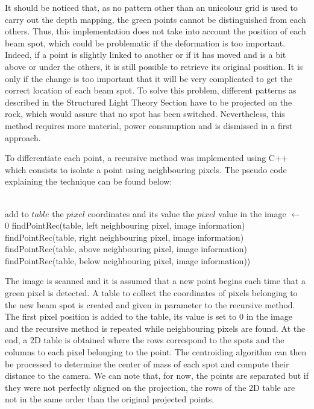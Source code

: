 It should be noticed that, as no pattern other than an unicolour grid is used to carry out the depth mapping, the green points cannot be distinguished from each others. Thus, this implementation does not take into account the position of each beam spot, which could be problematic if the deformation is too important. Indeed, if a point is slightly linked to another or if it has moved and is a bit above or under the others, it is still possible to retrieve its original position. It is only if the change is too important that it will be very complicated to get the correct location of each beam spot. To solve this problem, different patterns as described in the Structured Light Theory Section have to be projected on the rock, which would assure that no spot has been switched. Nevertheless, this method requires more material, power consumption and is dismissed in a first approach. 

To differentiate each point, a recursive method was implemented using C++ which consists to isolate a point using neighbouring pixels. The pseudo code explaining the technique can be found below:

\begin{algorithmic}
\\
    			\State add to $table$ the $pixel$ coordinates and its value
    			\State the $pixel$ value in the image $\gets$ 0
			\State findPointRec(table, left neighbouring pixel, image information)
			\State findPointRec(table, right neighbouring pixel, image information)
			\State findPointRec(table, above neighbouring pixel, image information)
			\State findPointRec(table, below neighbouring pixel, image information))
		\EndIf
\EndFunction
\end{algorithmic}

The image is scanned and it is assumed that a new point begins each time that a green pixel is detected. A table to collect the coordinates of pixels belonging to the new beam spot is created and given in parameter to the recursive method. The first pixel position is added to the table, its value is set to 0 in the image and the recursive method is repeated while neighbouring pixels are found. At the end, a 2D table is obtained where the rows correspond to the spots and the columns to each pixel belonging to the point. The centroiding algorithm can then be processed to determine the center of mass of each spot and compute their distance to the camera. We can note that, for now, the points are separated but if they were not perfectly aligned on the projection, the rows of the 2D table are not in the same order than the original projected points.